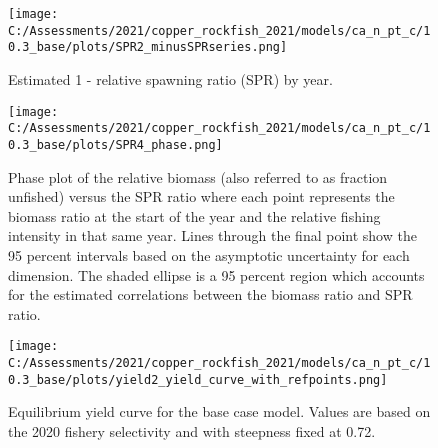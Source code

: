 \documentclass[11pt,
  english,
  a4paper,
]{article}
\begin{document}
\tagmcend\tagstructend

\clearpage


\begin{figure}
\centering
\texttt{[image: C:/Assessments/2021/copper\_rockfish\_2021/models/ca\_n\_pt\_c/10.3\_base/plots/SPR2\_minusSPRseries.png]}
\caption{Estimated 1 - relative spawning ratio (SPR) by year.\label{fig:1-spr}}
\end{figure}

\tagmcend\tagstructend


\begin{figure}
\centering
\texttt{[image: C:/Assessments/2021/copper\_rockfish\_2021/models/ca\_n\_pt\_c/10.3\_base/plots/SPR4\_phase.png]}
\caption{Phase plot of the relative biomass (also referred to as fraction unfished) versus the SPR ratio where each point represents the biomass ratio at the start of the year and the relative fishing intensity in that same year. Lines through the final point show the 95 percent intervals based on the asymptotic uncertainty for each dimension. The shaded ellipse is a 95 percent region which accounts for the estimated correlations between the biomass ratio and SPR ratio.\label{fig:phase}}
\end{figure}

\tagmcend\tagstructend


\begin{figure}
\centering
\texttt{[image: C:/Assessments/2021/copper\_rockfish\_2021/models/ca\_n\_pt\_c/10.3\_base/plots/yield2\_yield\_curve\_with\_refpoints.png]}
\caption{Equilibrium yield curve for the base case model. Values are based on the 2020 fishery selectivity and with steepness fixed at 0.72.\label{fig:yield}}
\end{figure}
\end{document}
